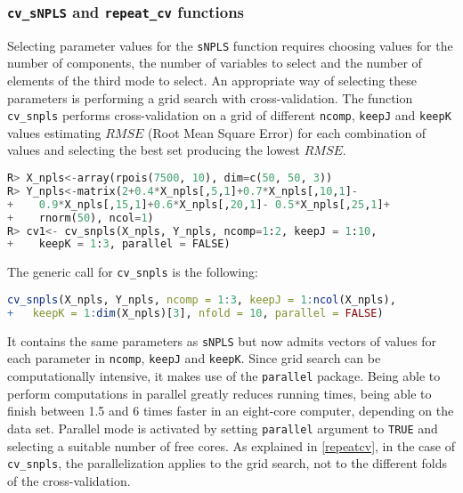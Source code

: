\subsubsection{\texttt{cv\_sNPLS} and \texttt{repeat\_cv} functions}
Selecting parameter values for the \texttt{sNPLS} function requires choosing values for the number of components, the number of variables to select and the number of elements of the third mode to select. An appropriate way of selecting these parameters is performing a grid search with cross-validation. The function \texttt{cv\_snpls} performs cross-validation on a grid of different \texttt{ncomp}, \texttt{keepJ} and \texttt{keepK} values estimating $RMSE$ (Root Mean Square Error) for each combination of values and selecting the best set producing the lowest $RMSE$.

\vspace{15pt}
\begin{lstlisting}[basicstyle=\small, language=Python, deletekeywords={max, scale}, morekeywords={array, matrix, rep, rpois, rnorm, function, cv_snpls}, otherkeywords={}]
R> X_npls<-array(rpois(7500, 10), dim=c(50, 50, 3))
R> Y_npls<-matrix(2+0.4*X_npls[,5,1]+0.7*X_npls[,10,1]-
+    0.9*X_npls[,15,1]+0.6*X_npls[,20,1]- 0.5*X_npls[,25,1]+
+    rnorm(50), ncol=1)
R> cv1<- cv_snpls(X_npls, Y_npls, ncomp=1:2, keepJ = 1:10, 
+    keepK = 1:3, parallel = FALSE)
\end{lstlisting}

The generic call for \texttt{cv\_snpls} is the following:
\vspace{15pt}
\begin{lstlisting}[basicstyle=\small, language=R, deletekeywords={max, scale}, morekeywords={array, matrix, rep, rpois, rnorm, function, cv_snpls}, otherkeywords={}]
cv_snpls(X_npls, Y_npls, ncomp = 1:3, keepJ = 1:ncol(X_npls),
+   keepK = 1:dim(X_npls)[3], nfold = 10, parallel = FALSE)
\end{lstlisting}

It contains the same parameters as \texttt{sNPLS} but now admits vectors of values for each parameter in \texttt{ncomp}, \texttt{keepJ} and \texttt{keepK}. Since grid search can be computationally intensive, it makes use of the \texttt{parallel} package. Being able to perform computations in parallel greatly reduces running times, being able to finish between 1.5 and 6 times faster in an eight-core computer, depending on the data set. Parallel mode is activated by setting \texttt{parallel} argument to \texttt{TRUE} and selecting a suitable number of free cores. As explained in \autoref{repeatcv}, in the case of \texttt{cv\_snpls}, the parallelization applies to the grid search, not to the different folds of the cross-validation.


